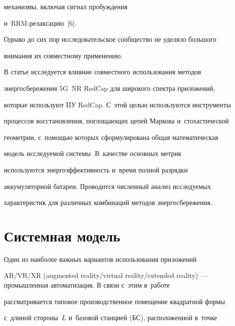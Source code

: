 механизмы, включая сигнал пробуждения 


и~RRM-ре\-лак\-са\-цию~[6]. 


Однако до сих пор исследовательское сообщество не уделяло большого 


внимания их совместному применению.


     


     В статье исследуется влияние совместного использования методов 


энергосбережения 5G~NR RedCap для широкого спектра приложений, 


которые используют ПУ RedCap. С~этой целью используются инструменты 


процессов восстановления, поглощающих цепей Маркова и~стохастической 


геометрии, с~помощью которых сформулирована общая математическая 


модель ис\-сле\-ду\-емой сис\-те\-мы. В~качестве основных метрик 


используются энергоэффективность и~время полной разрядки 


аккумуляторной батареи. Проводится численный анализ исследуемых 


характеристик для различных комбинаций методов энергосбережения.





\vspace*{-4pt}





\section{Системная модель}





\vspace*{-4pt}





     Один из наиболее важных вариантов использования приложений 


AR\!/\!VR\!/\!XR (augmented reality/virtual reality/extended reality)~--- промышленная автоматизация. В связи с~этим в~работе 


рассматривается типовое производственное помещение квадратной формы 


с~длиной стороны~$L$ и~базовой станцией (БС), расположенной в~точке 


